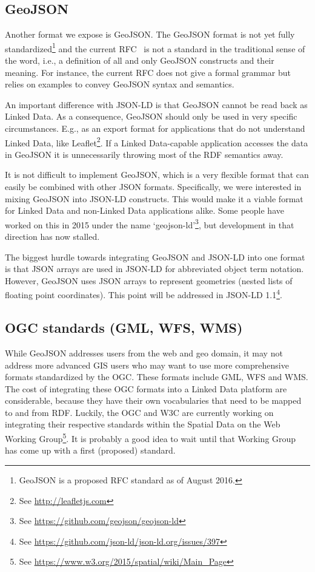 \documentclass[a4paper]{scrartcl}
\newcommand{\seeUrl}[1]{\footnote{See \mbox{\url{#1}}}}
\begin{document}
\subsection{GeoJSON}
\label{sec:geojson}

Another format we expose is GeoJSON.  The GeoJSON format is not yet
fully standardized\footnote{GeoJSON is a proposed RFC standard as of
  August 2016.} and the current RFC~\cite{Butler2016} is not a
standard in the traditional sense of the word, i.e., a definition of
all and only GeoJSON constructs and their meaning.  For instance, the
current RFC does not give a formal grammar but relies on examples to
convey GeoJSON syntax and semantics.

An important difference with JSON-LD is that GeoJSON cannot be read
back as Linked Data.  As a consequence, GeoJSON should only be used in
very specific circumstances.  E.g., as an export format for
applications that do not understand Linked Data, like
Leaflet\seeUrl{http://leafletjs.com}.  If a Linked Data-capable
application accesses the data in GeoJSON it is unnecessarily throwing
most of the RDF semantics away.

It is not difficult to implement GeoJSON, which is a very flexible
format that can easily be combined with other JSON formats.
Specifically, we were interested in mixing GeoJSON into JSON-LD
constructs.  This would make it a viable format for Linked Data and
non-Linked Data applications alike.  Some people have worked on this
in 2015 under the name
`geojson-ld'\seeUrl{https://github.com/geojson/geojson-ld}, but
development in that direction has now stalled.

The biggest hurdle towards integrating GeoJSON and JSON-LD into one
format is that JSON arrays are used in JSON-LD for abbreviated object
term notation.  However, GeoJSON uses JSON arrays to represent
geometries (nested lists of floating point coordinates).  This point
will be addressed in JSON-LD
1.1\seeUrl{https://github.com/json-ld/json-ld.org/issues/397}.


\subsection{OGC standards (GML, WFS, WMS)}
\label{sec:ogc}

While GeoJSON addresses users from the web and geo domain, it may not
address more advanced GIS users who may want to use more comprehensive
formats standardized by the OGC.  These formats include GML, WFS and
WMS.  The cost of integrating these OGC formats into a Linked Data
platform are considerable, because they have their own vocabularies
that need to be mapped to and from RDF.  Luckily, the OGC and W3C are
currently working on integrating their respective standards within the
Spatial Data on the Web Working
Group\seeUrl{https://www.w3.org/2015/spatial/wiki/Main_Page}.  It is
probably a good idea to wait until that Working Group has come up with
a first (proposed) standard.
\end{document}
